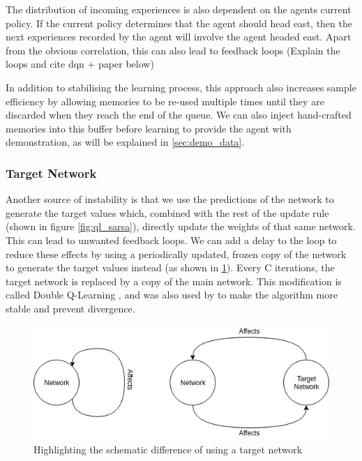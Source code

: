 The distribution of incoming experiences is also dependent on the agents current policy. If the current policy determines that the agent should head east, then the next experiences recorded by the agent will involve the agent headed east. Apart from the obvious correlation, this can also lead to feedback loops (Explain the loops and cite dqn + paper below)



In addition to stabilising the learning process, this approach also increases sample efficiency by allowing memories to be re-used multiple times until they are discarded when they reach the end of the queue. We can also inject hand-crafted memories into this buffer before learning to provide the agent with demonstration, as will be explained in \ref{sec:demo_data}.


\subsubsection{Target Network}\label{sec:target_network}
Another source of instability is that we use the predictions of the network to generate the target values which, combined with the rest of the update rule (shown in figure \ref{fig:ql_sarsa}), directly update the weights of that same network. This can lead to unwanted feedback loops. We can add a delay to the loop to reduce these effects by using a periodically updated, frozen copy of the network to generate the target values instead (as shown in \ref{fig:targetnet}). Every C iterations, the target network is replaced by a copy of the main network. This modification is called Double Q-Learning \citep{NIPS2010_3964}, and was also used by \citep{mnih2015human} to make the algorithm more stable and prevent divergence.

\begin{figure}[h]
    \centering
    \includegraphics[width=1\linewidth]{img/Target_Network.png}
    \caption{Highlighting the schematic difference of using a target network}
    \label{fig:targetnet}
\end{figure}


